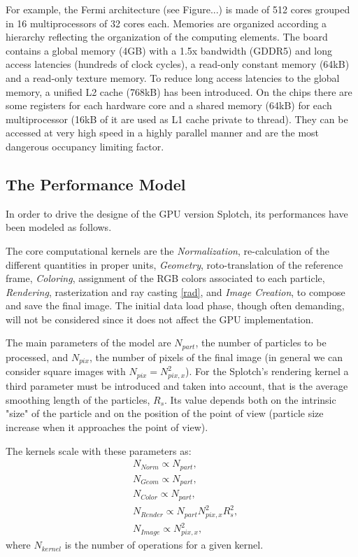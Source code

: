 \documentclass[11pt]{article}
\begin{document}
For example, the Fermi architecture (see Figure...) is made of 512 cores grouped in 16 multiprocessors of 32 cores each. Memories are organized according a hierarchy reflecting the organization of the computing elements. The board contains a global memory (4GB) with a 1.5x bandwidth (GDDR5) and long access latencies (hundreds of clock cycles), a read-only constant memory (64kB) and a read-only texture memory. To reduce long access latencies to the global memory, a unified L2 cache (768kB) has been introduced. On the chips there are some registers for each hardware core and a shared memory (64kB) for each multiprocessor (16kB of it are used as L1 cache private to thread). They can be accessed at very high speed in a highly parallel manner and are the most dangerous occupancy limiting factor.
 

\subsection{The Performance Model}

In order to drive the designe of the GPU version Splotch, its performances have been modeled
as follows.

The core computational kernels are the {\it Normalization}, re-calculation
of the different quantities in proper units, {\it Geometry}, roto-translation 
of the reference frame, {\it Coloring}, assignment of the RGB colors associated to each 
particle,  {\it Rendering},
rasterization and ray casting \eqref{rad}, 
and {\it Image Creation}, to compose and save 
the final image. The initial data load phase, though often demanding, will not be considered
since it does not affect the GPU implementation.

The main parameters of the model are $N_{part}$, the number of particles
to be processed, and $N_{pix}$, the number of pixels of the final image
(in general we can consider square images with $N_{pix}=N_{pix,x}^2$). For 
the Splotch's rendering kernel a third parameter must be introduced and
taken into account, that is the average smoothing length of the particles,
$R_s$. Its value depends both on the intrinsic "size" of the particle
and on the position of the point of view (particle size increase when it approaches 
the point of view).

The kernels scale with these parameters as:
\begin{align}\label{scaling}
& N_{Norm} \propto N_{part},\\
& N_{Geom} \propto N_{part},\\
& N_{Color} \propto N_{part},\\
& N_{Render} \propto N_{part}N_{pix,x}^2 R_s^2,\\
& N_{Image} \propto N_{pix,x}^2,
\end{align}
where $N_{kernel}$ is the number of operations for a given kernel.
\end{document}
